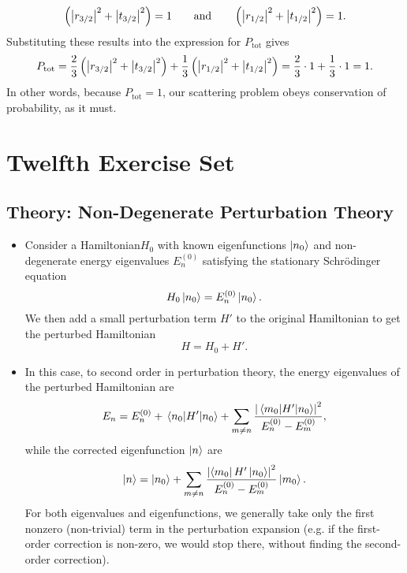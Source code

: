 \documentclass[11pt, a4paper]{article}
\newcommand{\eqtext}[1]{\qquad \text{#1} \qquad}
\newcommand{\Schro}{Schr\"{o}dinger\xspace}
\newcommand{\Ham}{Hamiltonian\xspace}
\begin{document}
\begin{itemize}
\begin{equation*}
		 \left(\abs{r_{3/2}}^{2} + \abs{t_{3/2}}^{2}\right) = 1  \eqtext{and}
		 \left(\abs{r_{1/2}}^{2} + \abs{t_{1/2}}^{2}\right) = 1.
	\end{equation*}
 	Substituting these results into the expression for $ P_{\text{tot}} $ gives
	\begin{equation*}
		P_{\text{tot}} = \frac{2}{3}\left(\abs{r_{3/2}}^{2} + \abs{t_{3/2}}^{2}\right) + \frac{1}{3}\left(\abs{r_{1/2}}^{2} + \abs{t_{1/2}}^{2}\right) = \frac{2}{3}\cdot 1 +  \frac{1}{3}\cdot 1 = 1.
	\end{equation*}
	In other words, because $ P_{\text{tot}} = 1 $, our scattering problem obeys conservation of probability, as it must.


	
\end{itemize}


\section{Twelfth Exercise Set}

\subsection{Theory: Non-Degenerate Perturbation Theory}

\begin{itemize}
	\item Consider a \Ham $ H_{0} $ with known eigenfunctions $ \ket{n_{0}} $ and non-degenerate energy eigenvalues $ E^{(0)}_{n} $ satisfying the stationary \Schro equation
	\begin{equation*}
		H_{0} \ket{n_{0}} = E^{(0)}_{n} \ket{n_{0}} .
	\end{equation*}
	We then add a small perturbation term $ H' $ to the original \Ham to get the perturbed \Ham
	\begin{equation*}
		H = H_{0} + H'.
	\end{equation*}
	
	\item In this case, to second order in perturbation theory, the energy eigenvalues of the perturbed Hamiltonian are
	\begin{equation*}
		E_{n} = E^{(0)}_{n} + \mel{n_{0}}{H'}{n_{0}} + \sum_{m\neq n}\frac{\abs{\mel{m_{0}}{H'}{n_{0}}}^{2}}{E^{(0)}_{n}-E^{(0)}_{m}},
	\end{equation*}
	while the corrected eigenfunction $ \ket{n} $ are
	\begin{equation*}
		\ket{n} = \ket{n_{0}} + \sum_{m\neq n}\frac{\abs{\bra{m_{0}}H'\ket{n_{0}}}^{2}}{E^{(0)}_{n}-E^{(0)}_{m}} \ket{m_{0}}.
	\end{equation*}
	For both eigenvalues and eigenfunctions, we generally take only the first nonzero (non-trivial) term in the perturbation expansion (e.g. if the first-order correction is non-zero, we would stop there, without finding the second-order correction).

\end{itemize}
\end{document}
